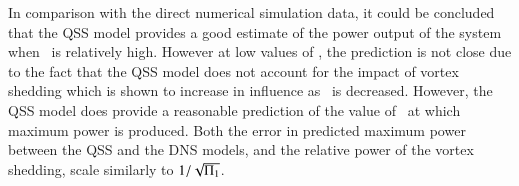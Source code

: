 In comparison with the direct numerical simulation data, it could be concluded that the QSS model provides a good estimate of the power output of the system when \massstiff\ is relatively high. However at low values of \massstiff, the prediction is not close due to the fact that the QSS model does not account for the impact of vortex shedding which is shown to increase in influence as \massstiff\ is decreased. However, the QSS model does provide a reasonable prediction of the value of \massdamp\ at which maximum power is produced. Both the error in predicted maximum power between the QSS and the DNS models, and the relative power of the vortex shedding, scale similarly to $1/\sqrt{\Pi_1}$.
  
  
  
  
 
 
 
 
 
 
 
 
 
 
 
 
 
 
 
 
 
 
 
 
 
 
 
 
 
 







